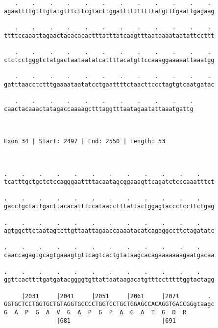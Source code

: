 \documentclass{article}
\begin{document}
\begin{Verbatim}
   .    .    .    .    .    .    .    .    .    .    .    . 
agaattttgtttgtatgtttcttcgtacttggattttttttttatgtttgaattgagaag
                                                            
   .    .    .    .    .    .    .    .    .    .    .    . 
ttttccaaattagaactacacacactttatttatcaagtttaataaaataatattccttt
                                                            
   .    .    .    .    .    .    .    .    .    .    .    . 
ctctcctgggtctatgactaataatatcattttacatgttccaaaggaaaaattaaatgg
                                                            
   .    .    .    .    .    .    .    .    .    .    .    . 
gatttaacctctttgaaaataatatcctgaattttctaacttccctagtgtcaatgatac
                                                            
   .    .    .    .    .    .    .    .    .    .    .
caactacaaactatagaccaaaagctttaggtttaatagaatattaaatgattg
                                                      
                                                      
 
Exon 34 | Start: 2497 | End: 2550 | Length: 53



.    .    .    .    .    .    .    .    .    .    .    .    
tcatttgctgctctccagggaattttacaatagcggaaagttcagatctcccaaatttct
                                                            
.    .    .    .    .    .    .    .    .    .    .    .    
gacctgctattgacttacacatttccataacctttattactggagtaccctccttctgag
                                                            
.    .    .    .    .    .    .    .    .    .    .    .    
agtggcttctaatagtcttgttaattagaaccaaaatacatcagaggccttctagatatc
                                                            
.    .    .    .    .    .    .    .    .    .    .    .    
caaccagagtgcagtgaaagtgttcagtcactgtataagcacagaaaaaaagaatgacaa
                                                            
.    .    .    .    .    .    .    .    .    .    .    .    
ggttcacttttgatgatacggggtgttattaataagacatgtttcctttttggtactagg
                                                            
     |2031     |2041     |2051     |2061     |2071        . 
GGTGCTCCTGGTGCTGTAGGTGCCCCTGGTCCTGCTGGAGCCACAGGTGACCGGgtaagc
G  A  P  G  A  V  G  A  P  G  P  A  G  A  T  G  D  R        
               |681                          |691           
  

\end{Verbatim}
\end{document}
